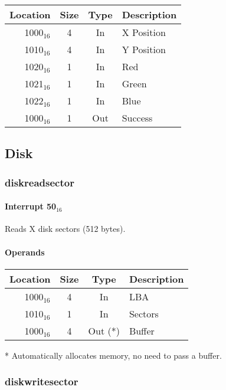 \documentclass{article}
\begin{document}
\begin{tabular}{|r|c|c|l|}
	\hline
	\textbf{Location} & \textbf{Size} & \textbf{Type} & \textbf{Description} \\
	\hline
	1000$_{16}$ & 4 & In & X Position \\
	\hline
	1010$_{16}$ & 4 & In & Y Position \\
	\hline
	1020$_{16}$ & 1 & In & Red \\
	\hline
	1021$_{16}$ & 1 & In & Green \\
	\hline
	1022$_{16}$ & 1 & In & Blue \\
	\hline
	1000$_{16}$ & 1 & Out & Success \\
	\hline
\end{tabular}

\subsection{Disk}

\subsubsection{diskreadsector}

\paragraph{Interrupt 50$_{16}$}

Reads X disk sectors (512 bytes).

\paragraph{Operands}

\begin{tabular}{|r|c|c|l|}
	\hline
	\textbf{Location} & \textbf{Size} & \textbf{Type} & \textbf{Description} \\
	\hline
	1000$_{16}$ & 4 & In & LBA \\
	\hline
	1010$_{16}$ & 1 & In & Sectors \\
	\hline
	1000$_{16}$ & 4 & Out (*) & Buffer \\
	\hline
\end{tabular}

* Automatically allocates memory, no need to pass a buffer.

\subsubsection{diskwritesector}
\end{document}
